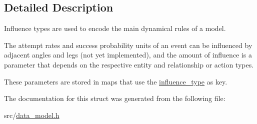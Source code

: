 \subsection{Detailed Description}
Influence types are used to encode the main dynamical rules of a model. 

The attempt rates and success probability units of an event can be influenced by adjacent angles and legs (not yet implemented), and the amount of influence is a parameter that depends on the respective entity and relationship or action types.

These parameters are stored in maps that use the \hyperlink{structtricl_1_1influence__type}{influence\+\_\+type} as key. 

The documentation for this struct was generated from the following file\+:\begin{DoxyCompactItemize}
\item 
src/\hyperlink{data__model_8h}{data\+\_\+model.\+h}\end{DoxyCompactItemize}
